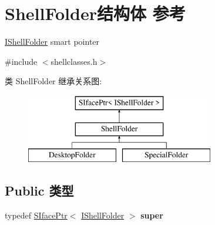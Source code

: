 \hypertarget{struct_shell_folder}{}\section{Shell\+Folder结构体 参考}
\label{struct_shell_folder}


\hyperlink{interface_i_shell_folder}{I\+Shell\+Folder} smart pointer  




{\ttfamily \#include $<$shellclasses.\+h$>$}

类 Shell\+Folder 继承关系图\+:\begin{figure}[H]
\begin{center}
\leavevmode
\includegraphics[height=3.000000cm]{struct_shell_folder}
\end{center}
\end{figure}
\subsection*{Public 类型}
\begin{DoxyCompactItemize}
\item 
\mbox{\label{struct_shell_folder_ae8ec792e695f78aa3d3ea389f2fc8950}} 
typedef \hyperlink{struct_s_iface_ptr}{S\+Iface\+Ptr}$<$ \hyperlink{interface_i_shell_folder}{I\+Shell\+Folder} $>$ {\bfseries super}
\end{DoxyCompactItemize}
